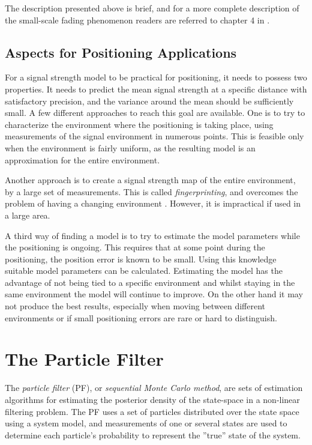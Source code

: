 \documentclass{LTHthesis}
\begin{document}
The description presented above is brief, and for a more complete description of the small-scale fading phenomenon readers are referred to chapter 4 in \cite{rappaport96}.  
 \section{Aspects for Positioning Applications}
 \label{sec:AfPA}
 For a signal strength model to be practical for positioning, it needs to possess two properties. It needs to predict the mean signal strength at a specific distance with satisfactory precision, and the variance around the mean should be sufficiently small. A few different approaches to reach this goal are available. One is to try to characterize the environment where the positioning is taking place, using measurements of the signal environment in numerous points. This is feasible only when the environment is fairly uniform, as the resulting model is an approximation for the entire environment. 
 
 Another approach is to create a signal strength map of the entire environment, by a large set of measurements. This is called \emph{fingerprinting}, and overcomes the problem of having a changing environment \cite{fingerprinting}. However, it is impractical if used in a large area. 
 
 A third way of finding a model is to try to estimate the model parameters while the positioning is ongoing. This requires that at some point during the positioning, the position error is known to be small. Using this knowledge suitable model parameters can be calculated. Estimating the model has the advantage of not being tied to a specific environment and whilst staying in the same environment the model will continue to improve. On the other hand it may not produce the best results, especially when moving between different environments or if small positioning errors are rare or hard to distinguish.        
\chapter{The Particle Filter}
\label{chap:PF}
%
The \emph{particle filter} (PF), or \emph{sequential Monte Carlo method}, are sets of estimation algorithms for estimating the posterior density of the state-space in a non-linear filtering problem. The PF uses a set of particles distributed over the state space using a system model, and measurements of one or several states are used to determine each particle's probability to represent the ''true'' state of the system.  
\end{document}
